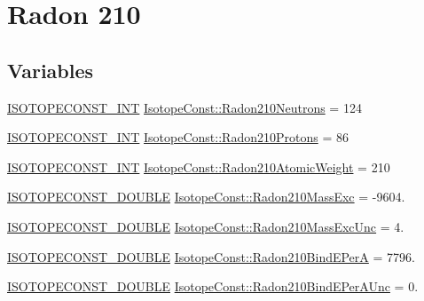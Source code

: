 \hypertarget{group___isotope_const-_radon-_rn210}{}\section{Radon 210}
\label{group___isotope_const-_radon-_rn210}
\subsection*{Variables}
\begin{DoxyCompactItemize}
\item 
\mbox{\hyperlink{group___isotope_const-_macros_ga5f18360b3e99483a35c32d789e62621c}{I\+S\+O\+T\+O\+P\+E\+C\+O\+N\+S\+T\+\_\+\+I\+NT}} \mbox{\hyperlink{group___isotope_const-_radon-_rn210_ga1f4277d8526926854a6b7b33add24718}{Isotope\+Const\+::\+Radon210\+Neutrons}} = 124
\item 
\mbox{\hyperlink{group___isotope_const-_macros_ga5f18360b3e99483a35c32d789e62621c}{I\+S\+O\+T\+O\+P\+E\+C\+O\+N\+S\+T\+\_\+\+I\+NT}} \mbox{\hyperlink{group___isotope_const-_radon-_rn210_ga9534208da011e16996952a3e008a364a}{Isotope\+Const\+::\+Radon210\+Protons}} = 86
\item 
\mbox{\hyperlink{group___isotope_const-_macros_ga5f18360b3e99483a35c32d789e62621c}{I\+S\+O\+T\+O\+P\+E\+C\+O\+N\+S\+T\+\_\+\+I\+NT}} \mbox{\hyperlink{group___isotope_const-_radon-_rn210_ga6f73990ff1fdc7ec75bd23c4d96650aa}{Isotope\+Const\+::\+Radon210\+Atomic\+Weight}} = 210
\item 
\mbox{\hyperlink{group___isotope_const-_macros_ga8f45a7272ce02c0b4c65c44636ed719a}{I\+S\+O\+T\+O\+P\+E\+C\+O\+N\+S\+T\+\_\+\+D\+O\+U\+B\+LE}} \mbox{\hyperlink{group___isotope_const-_radon-_rn210_gab7e46c2aaa0c768fef832b0ef583331c}{Isotope\+Const\+::\+Radon210\+Mass\+Exc}} = -\/9604.
\item 
\mbox{\hyperlink{group___isotope_const-_macros_ga8f45a7272ce02c0b4c65c44636ed719a}{I\+S\+O\+T\+O\+P\+E\+C\+O\+N\+S\+T\+\_\+\+D\+O\+U\+B\+LE}} \mbox{\hyperlink{group___isotope_const-_radon-_rn210_ga9b8401af4cc4609cd42efcde1ac6f654}{Isotope\+Const\+::\+Radon210\+Mass\+Exc\+Unc}} = 4.
\item 
\mbox{\hyperlink{group___isotope_const-_macros_ga8f45a7272ce02c0b4c65c44636ed719a}{I\+S\+O\+T\+O\+P\+E\+C\+O\+N\+S\+T\+\_\+\+D\+O\+U\+B\+LE}} \mbox{\hyperlink{group___isotope_const-_radon-_rn210_ga1c942107a58ad556d77f485633b527d9}{Isotope\+Const\+::\+Radon210\+Bind\+E\+PerA}} = 7796.
\item 
\mbox{\hyperlink{group___isotope_const-_macros_ga8f45a7272ce02c0b4c65c44636ed719a}{I\+S\+O\+T\+O\+P\+E\+C\+O\+N\+S\+T\+\_\+\+D\+O\+U\+B\+LE}} \mbox{\hyperlink{group___isotope_const-_radon-_rn210_ga19f09879a381acffe3bb6c82ef330386}{Isotope\+Const\+::\+Radon210\+Bind\+E\+Per\+A\+Unc}} = 0.

\end{DoxyCompactItemize}
